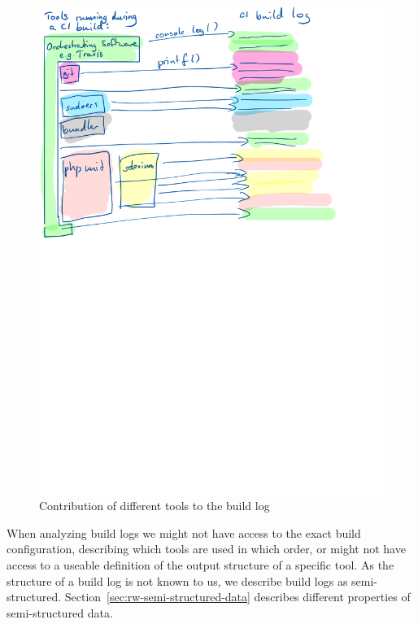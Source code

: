 \documentclass[\myrootdir/main.tex]{subfiles}
\begin{document}
\begin{figure}[htbp]
	\centering
	\includegraphics[width=\textwidth, trim={0cm 15cm 0cm 0cm}, clip]{img/tool-log-contribution.pdf}
	\caption{Contribution of different tools to the build log}
	\label{fig:tool-log-contribution}
\end{figure}

When analyzing build logs we might not have access to the exact build configuration, describing which tools are used in which order, or might not have access to a useable definition of the output structure of a specific tool.
As the structure of a build log is not known to us, we describe build logs as semi-structured. Section~\ref{sec:rw-semi-structured-data} describes different properties of semi-structured data.
\end{document}
